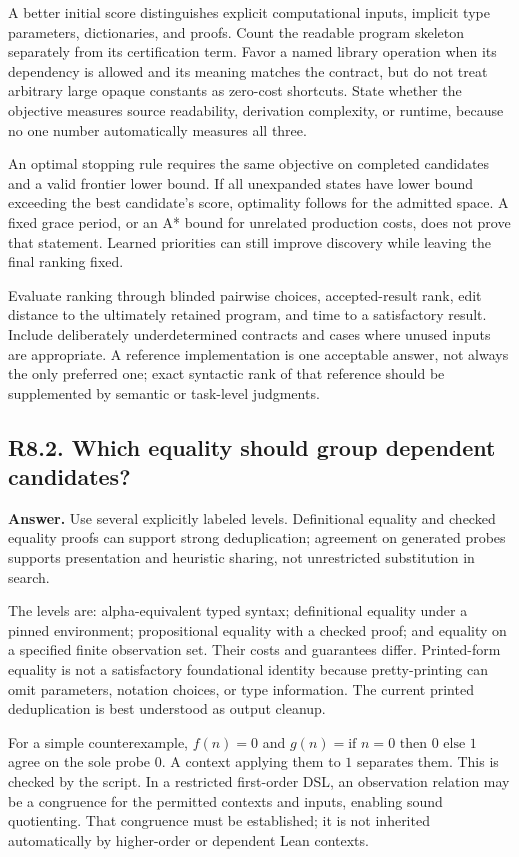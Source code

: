 \documentclass[11pt,a4paper]{article}
\newcommand{\question}[2]{\subsection{#1. #2}\label{q:#1}}
\theoremstyle{definition}
\theoremstyle{remark}
\begin{document}
A better initial score distinguishes explicit computational inputs, implicit type parameters, dictionaries, and proofs. Count the readable program skeleton separately from its certification term. Favor a named library operation when its dependency is allowed and its meaning matches the contract, but do not treat arbitrary large opaque constants as zero-cost shortcuts. State whether the objective measures source readability, derivation complexity, or runtime, because no one number automatically measures all three.

An optimal stopping rule requires the same objective on completed candidates and a valid frontier lower bound. If all unexpanded states have lower bound exceeding the best candidate's score, optimality follows for the admitted space. A fixed grace period, or an A* bound for unrelated production costs, does not prove that statement. Learned priorities can still improve discovery while leaving the final ranking fixed.

Evaluate ranking through blinded pairwise choices, accepted-result rank, edit distance to the ultimately retained program, and time to a satisfactory result. Include deliberately underdetermined contracts and cases where unused inputs are appropriate. A reference implementation is one acceptable answer, not always the only preferred one; exact syntactic rank of that reference should be supplemented by semantic or task-level judgments.

\question{R8.2}{Which equality should group dependent candidates?}

\textbf{Answer.} Use several explicitly labeled levels. Definitional equality and checked equality proofs can support strong deduplication; agreement on generated probes supports presentation and heuristic sharing, not unrestricted substitution in search.

The levels are: alpha-equivalent typed syntax; definitional equality under a pinned environment; propositional equality with a checked proof; and equality on a specified finite observation set. Their costs and guarantees differ. Printed-form equality is not a satisfactory foundational identity because pretty-printing can omit parameters, notation choices, or type information. The current printed deduplication is best understood as output cleanup.\cite{repo-engine}

For a simple counterexample, $f(n)=0$ and $g(n)=\text{if }n=0\text{ then }0\text{ else }1$ agree on the sole probe $0$. A context applying them to $1$ separates them. This is checked by the script. In a restricted first-order DSL, an observation relation may be a congruence for the permitted contexts and inputs, enabling sound quotienting. That congruence must be established; it is not inherited automatically by higher-order or dependent Lean contexts.
\end{document}
